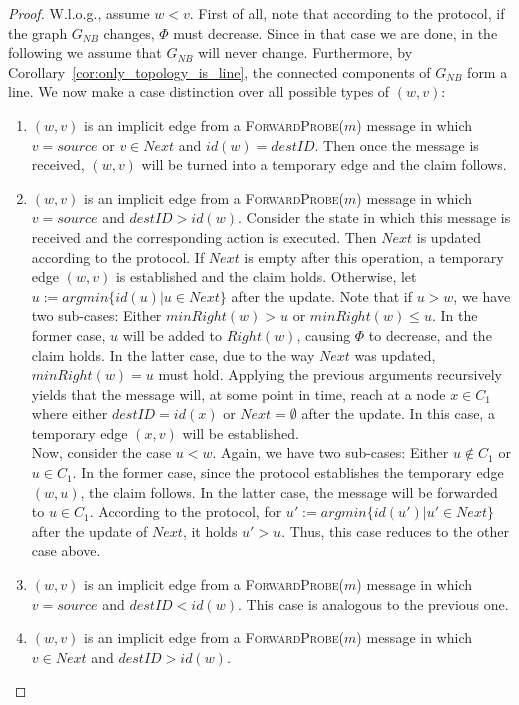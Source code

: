 \documentclass[a4paper,USenglish]{lipics}
\newcommand{\forwardprobe}[1]{\textsc{ForwardProbe(\ensuremath{#1})}\xspace}
\begin{document}
 \begin{proof}
W.l.o.g., assume $w<v$.
First of all, note that according to the protocol, if the graph $G_{NB}$ changes, $\Phi$ must decrease.
Since in that case we are done, in the following we assume that $G_{NB}$ will never change.
Furthermore, by Corollary~\ref{cor:only_topology_is_line}, the connected components of $G_{NB}$ form a line.
We now make a case distinction over all possible types of $(w,v)$:
 \begin{enumerate}
  \item $(w,v)$ is an implicit edge from a \forwardprobe{m} message in which $v = source$ or $v \in Next$ and $id(w)=destID$. 
	Then once the message is received, $(w,v)$ will be turned into a temporary edge and the claim follows.
   \item $(w,v)$ is an implicit edge from a \forwardprobe{m} message in which $v=source$ and $destID > id(w)$.    
	Consider the state in which this message is received and the corresponding action is executed.
	Then $Next$ is updated according to the protocol.
	If $Next$ is empty after this operation, a temporary edge $(w,v)$ is established and the claim holds.	
	Otherwise, let $u:= argmin\{id(u)|u \in Next\}$ after the update.
	Note that if $u > w$, we have two sub-cases: Either $minRight(w) > u$ or $minRight(w) \leq u$.
	In the former case, $u$ will be added to $Right(w)$, causing $\Phi$ to decrease, and the claim holds.
	In the latter case, due to the way $Next$ was updated, $minRight(w) = u$ must hold.
	Applying the previous arguments recursively yields that the message will, at some point in time, reach at a node $x \in C_1$ where either $destID = id(x)$ or $Next = \emptyset$ after the update.
	In this case, a temporary edge $(x,v)$ will be established.
	\\
	Now, consider the case $u < w$.
	Again, we have two sub-cases: Either $u \notin C_1$ or $u \in C_1$.
	In the former case, since the protocol establishes the temporary edge $(w,u)$, the claim follows.
	In the latter case, the message will be forwarded to $u \in C_1$.
	According to the protocol, for $u' := argmin\{id(u')|u' \in Next\}$ after the update of $Next$, it holds $u' > u$. Thus, this case reduces to the other case above.
  \item $(w,v)$ is an implicit edge from a \forwardprobe{m} message in which $v=source$ and $destID < id(w)$.    
	This case is analogous to the previous one.
  \item $(w,v)$ is an implicit edge from a \forwardprobe{m} message in which $v\in Next$ and $destID > id(w)$.    	

\end{enumerate}
\end{proof}
\end{document}
